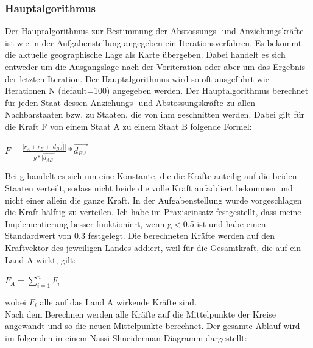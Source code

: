 \documentclass[a4paper,11pt]{article}
\begin{document}
{\subsubsection{Hauptalgorithmus}
Der Hauptalgorithmus zur Bestimmung der Abstossungs- und Anziehungskr\"afte ist wie in der Aufgabenstellung angegeben ein Iterationsverfahren.
Es bekommt die aktuelle geographische Lage als Karte \"ubergeben. Dabei handelt es sich entweder um die Ausgangslage nach der Voriteration oder aber um das Ergebnis
der letzten Iteration. Der Hauptalgorithmus wird so oft ausgef\"uhrt wie Iterationen N (default=100) angegeben werden. Der Hauptalgorithmus berechnet f\"ur jeden Staat
dessen Anziehungs- und Abstossungskr\"afte zu allen Nachbarstaaten bzw. zu Staaten, die von ihm geschnitten werden. Dabei gilt f\"ur die Kraft F von einem Staat A zu einem Staat B
folgende Formel:\\
\begin{center}
\LARGE{$ F = \frac{|r_{A}+r_{B}+|\vec{d_{BA}}||}{g * |\vec{d_{AB}|}} * \vec{d_{BA}}$}
\end{center}
\vspace{5mm}
Bei g handelt es sich um eine Konstante, die die Kr\"afte anteilig auf die beiden Staaten verteilt, sodass nicht beide die volle Kraft aufaddiert bekommen und nicht einer allein die ganze Kraft.
In der Aufgabenstellung wurde vorgeschlagen die Kraft h\"alftig zu verteilen. Ich habe im Praxiseinsatz festgestellt, dass meine Implementierung besser funktioniert, wenn g$<$0.5 ist und habe einen
Standardwert von 0.3 festgelegt. Die berechneten Kr\"afte werden auf den Kraftvektor des jeweiligen Landes addiert, weil f\"ur die Gesamtkraft, die auf ein Land A wirkt, gilt:\\
\begin{center}
\LARGE{$ F_{A} = \sum_{i=1}^{n} F_{i} $}
\end{center}
\vspace{5mm}
wobei $ F_{i}$ alle auf das Land A wirkende Kr\"afte sind.\\

Nach dem Berechnen werden alle Kr\"afte auf die Mittelpunkte der Kreise angewandt und so die \glqq{}neuen\grqq{} Mittelpunkte berechnet. Der gesamte Ablauf
wird im folgenden in einem Nassi-Shneiderman-Diagramm dargestellt:

}
\end{document}
